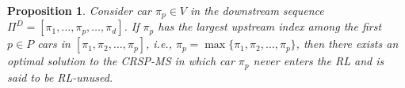\documentclass[12pt]{article}
\newtheorem{proposition}[theorem]{Proposition}
\begin{document}

\begin{proposition}\label{pro2}
    Consider car $\pi_{p}\in V$ in the downstream sequence $\Pi^{D}=[\pi_1,\dots,\pi_p,\dots,\pi_{d}]$. If $\pi_p$ has the largest upstream index among the first $p\in P$ cars in $[\pi_1,\pi_2,\dots,\pi_p]$, i.e., $\pi_p=\max\{\pi_1,\pi_2,\dots,\pi_p\}$, then there exists an optimal solution to the CRSP-MS in which car $\pi_p$ never enters the RL and is said to be RL-unused.


\end{proposition}
\end{document}
